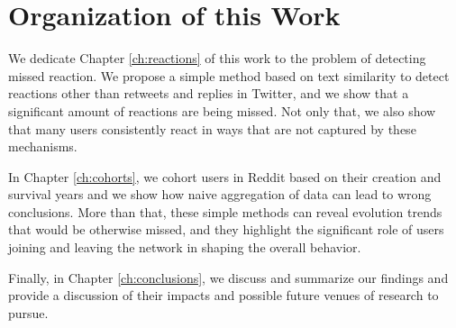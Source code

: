 \section{Organization of this Work}

We dedicate Chapter \ref{ch:reactions} of this work to the problem of detecting missed reaction. We propose a simple method based on text similarity to detect reactions other than retweets and replies in Twitter, and we show that a significant amount of reactions are being missed. Not only that, we also show that many users consistently react in ways that are not captured by these mechanisms.

In Chapter \ref{ch:cohorts}, we cohort users in Reddit based on their creation and survival years and we show how naive aggregation of data can lead to wrong conclusions. More than that, these simple methods can reveal evolution trends that would be otherwise missed, and they highlight the significant role of users joining and leaving the network in shaping the overall behavior.

Finally, in Chapter \ref{ch:conclusions}, we discuss and summarize our findings and provide a discussion of their impacts and possible future venues of research to pursue.